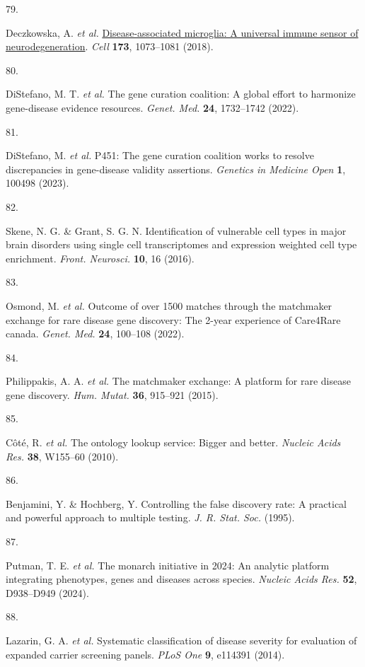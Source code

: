 \documentclass[
]{report}
\newlength{\cslhangindent}
\newlength{\csllabelwidth}
\newenvironment{CSLReferences}[2] %
 {\begin{list}{}{%
  \setlength{\itemindent}{0pt}
  \setlength{\leftmargin}{0pt}
  \setlength{\parsep}{0pt}
  \ifodd #1
   \setlength{\leftmargin}{\cslhangindent}
   \setlength{\itemindent}{-1\cslhangindent}
  \fi
  \setlength{\itemsep}{#2\baselineskip}}}
 {\end{list}}
\newcommand{\CSLLeftMargin}[1]{\parbox[t]{\csllabelwidth}{\strut#1\strut}}
\newcommand{\CSLRightInline}[1]{\parbox[t]{\linewidth - \csllabelwidth}{\strut#1\strut}}
\begin{document}
\begin{CSLReferences}{0}{0}
\CSLLeftMargin{79. }%
\CSLRightInline{Deczkowska, A. \emph{et al.}
\href{https://doi.org/10.1016/j.cell.2018.05.003}{Disease-associated
microglia: A universal immune sensor of neurodegeneration}. \emph{Cell}
\textbf{173}, 1073--1081 (2018).}

\CSLLeftMargin{80. }%
\CSLRightInline{DiStefano, M. T. \emph{et al.} The gene curation
coalition: A global effort to harmonize gene-disease evidence resources.
\emph{Genet. Med.} \textbf{24}, 1732--1742 (2022).}

\CSLLeftMargin{81. }%
\CSLRightInline{DiStefano, M. \emph{et al.} P451: The gene curation
coalition works to resolve discrepancies in gene-disease validity
assertions. \emph{Genetics in Medicine Open} \textbf{1}, 100498 (2023).}

\CSLLeftMargin{82. }%
\CSLRightInline{Skene, N. G. \& Grant, S. G. N. Identification of
vulnerable cell types in major brain disorders using single cell
transcriptomes and expression weighted cell type enrichment.
\emph{Front. Neurosci.} \textbf{10}, 16 (2016).}

\CSLLeftMargin{83. }%
\CSLRightInline{Osmond, M. \emph{et al.} Outcome of over 1500 matches
through the matchmaker exchange for rare disease gene discovery: The
2-year experience of {Care4Rare} canada. \emph{Genet. Med.} \textbf{24},
100--108 (2022).}

\CSLLeftMargin{84. }%
\CSLRightInline{Philippakis, A. A. \emph{et al.} The matchmaker
exchange: A platform for rare disease gene discovery. \emph{Hum. Mutat.}
\textbf{36}, 915--921 (2015).}

\CSLLeftMargin{85. }%
\CSLRightInline{Côté, R. \emph{et al.} The ontology lookup service:
Bigger and better. \emph{Nucleic Acids Res.} \textbf{38}, W155--60
(2010).}

\CSLLeftMargin{86. }%
\CSLRightInline{Benjamini, Y. \& Hochberg, Y. Controlling the false
discovery rate: A practical and powerful approach to multiple testing.
\emph{J. R. Stat. Soc.} (1995).}

\CSLLeftMargin{87. }%
\CSLRightInline{Putman, T. E. \emph{et al.} The monarch initiative in
2024: An analytic platform integrating phenotypes, genes and diseases
across species. \emph{Nucleic Acids Res.} \textbf{52}, D938--D949
(2024).}

\CSLLeftMargin{88. }%
\CSLRightInline{Lazarin, G. A. \emph{et al.} Systematic classification
of disease severity for evaluation of expanded carrier screening panels.
\emph{PLoS One} \textbf{9}, e114391 (2014).}

\end{CSLReferences}
\end{document}
